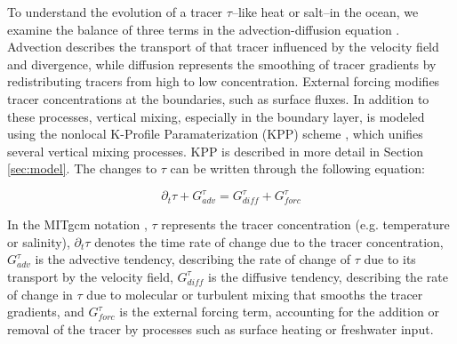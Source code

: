 \documentclass[draft]{agujournal2019}
\begin{document}
To understand the evolution of a tracer $\tau$--like heat or salt--in the ocean, we examine the balance of three terms in the advection-diffusion equation \cite{Campin2004}. Advection describes the transport of that tracer influenced by the velocity field and divergence, while diffusion represents the smoothing of tracer gradients by redistributing tracers from high to low concentration. External forcing modifies tracer concentrations at the boundaries, such as surface fluxes. In addition to these processes, vertical mixing, especially in the boundary layer, is modeled using the nonlocal K-Profile Paramaterization (KPP) scheme \cite{Large1994}, which unifies several vertical mixing processes. KPP is described in more detail in Section \ref{sec:model}. The changes to $\tau$ can be written through the following equation:

$$
\partial_t\tau + G^\tau_{adv} = G^\tau_{diff} + G^\tau_{forc}
$$

In the MITgcm notation \cite{Campin2004,mitgcm_manual}, $\tau$ represents the tracer concentration (e.g. temperature or salinity), $\partial_t \tau$ denotes the time rate of change due to the tracer concentration, $G^{\tau}_{adv}$ is the advective tendency, describing the rate of change of $\tau$ due to its transport by the velocity field, $G^{\tau}_{diff}$ is the diffusive tendency, describing the rate of change in $\tau$ due to molecular or turbulent mixing that smooths the tracer gradients, and $G^{\tau}_{forc}$ is the external forcing term, accounting for the addition or removal of the tracer by processes such as surface heating or freshwater input. 
\end{document}
